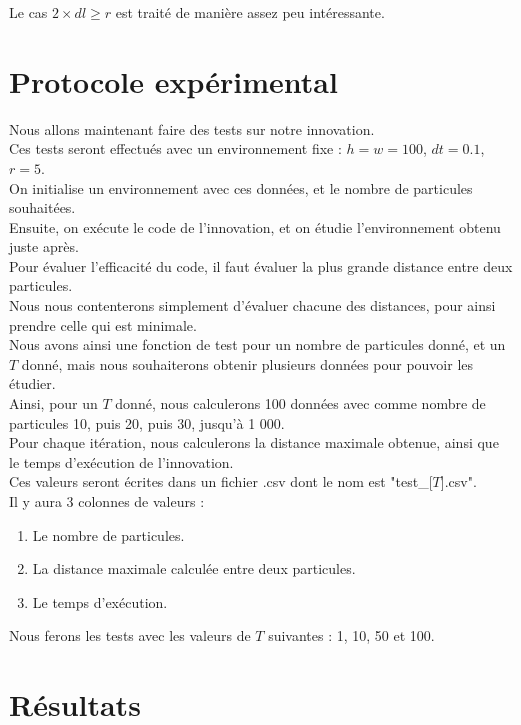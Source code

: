 \documentclass{article}
\begin{document}
Le cas $2 \times dl \ge r$ est traité de manière assez peu intéressante.

\section{Protocole expérimental}


Nous allons maintenant faire des tests sur notre innovation.
\\
Ces tests seront effectués avec un environnement fixe : $h = w = 100$, $dt = 0.1$, $r = 5$.
\\[5 mm]
On initialise un environnement avec ces données, et le nombre de particules souhaitées.
\\
Ensuite, on exécute le code de l'innovation, et on étudie l'environnement obtenu juste après.
\\[5 mm]
Pour évaluer l'efficacité du code, il faut évaluer la plus grande distance entre deux particules.
\\
Nous nous contenterons simplement d'évaluer chacune des distances, pour ainsi prendre celle qui est minimale.
\\[5 mm]
Nous avons ainsi une fonction de test pour un nombre de particules donné, et un $T$ donné, mais nous souhaiterons obtenir plusieurs données pour pouvoir les étudier.
\\
Ainsi, pour un $T$ donné, nous calculerons 100 données avec comme nombre de particules 10, puis 20, puis 30, jusqu'à 1 000.
\\
Pour chaque itération, nous calculerons la distance maximale obtenue, ainsi que le temps d'exécution de l'innovation.
\\[5 mm] 
Ces valeurs seront écrites dans un fichier .csv dont le nom est "test\_[$T$].csv".
\\
Il y aura 3 colonnes de valeurs :
\begin{enumerate}
    \item Le nombre de particules.
    \item La distance maximale calculée entre deux particules.
    \item Le temps d'exécution.
\end{enumerate}

Nous ferons les tests avec les valeurs de $T$ suivantes : 1, 10, 50 et 100.

\section{Résultats}
\end{document}
